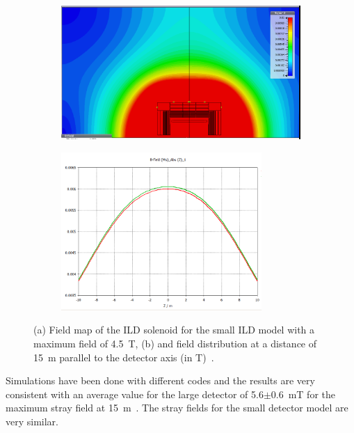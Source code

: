 \begin{figure}[h!]
\begin{center}
\begin{subfigure}{0.75\hsize} \includegraphics[width=\textwidth]{Integration/fig/strayfield_small_4_5.png}
\caption{ \label{ild:fig:magnet_small_stray_map}}
 \end{subfigure}
\hspace{0.03\textwidth}
\begin{subfigure}{0.75\hsize} \includegraphics[width=\textwidth, height =6cm]{Integration/fig/strayfield_small_4_5_plot.png}
\caption{  \label{ild:fig:magnet_small_stray_field}}
 \end{subfigure}
\end{center}
\caption{(a) Field map of the ILD solenoid for the small ILD model with a maximum field of 4.5~T, (b) and field distribution at a distance of 15~m parallel to the detector axis (in T)~\cite{ild:bib:Magnet_Simulations}.}
\label{ILD:fig:magnet_small_stray}
\end{figure}

Simulations have been done with different codes and the results are very consistent with an average value for the large detector of 5.6$\pm$0.6~mT for the maximum stray field at 15~m~\cite{ild:bib:Magnet_Simulations}. The stray fields for the small detector model are very similar. 

